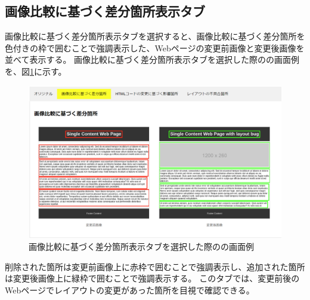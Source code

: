 \subsection{画像比較に基づく差分箇所表示タブ}\label{subsec:images_tab}
画像比較に基づく差分箇所表示タブを選択すると、画像比較に基づく差分箇所を色付きの枠で囲むことで強調表示した、Webページの変更前画像と変更後画像を並べて表示する。
画像比較に基づく差分箇所表示タブを選択した際の\toolName の画面例を、図\ref{fig: Appearance_images_tab}に示す。
\begin{figure}[tp]
    \begin{center}
        \includegraphics[width=1.0\columnwidth]{image/3_images_tab2.png}
        \caption{画像比較に基づく差分箇所表示タブを選択した際の\toolName の画面例}
        \label{fig: Appearance_images_tab}
    \end{center}
\end{figure}
削除された箇所は変更前画像上に赤枠で囲むことで強調表示し、追加された箇所は変更後画像上に緑枠で囲むことで強調表示する。
このタブでは、変更前後のWebページでレイアウトの変更があった箇所を目視で確認できる。

